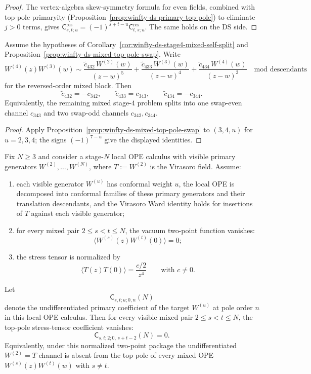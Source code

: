 \begin{proof}
The vertex-algebra skew-symmetry formula for even fields, combined with top-pole primaryity (Proposition~\ref{prop:winfty-ds-primary-top-pole}) to eliminate $j>0$ terms, gives $\mathsf{C}_{s,t;u}^{\mathrm{res}}=(-1)^{s+t-u}\mathsf{C}_{t,s;u}^{\mathrm{res}}$. The same holds on the DS side.
\end{proof}

\begin{corollary}
\label{cor:winfty-ds-stage4-mixed-swap-parity}
Assume the hypotheses of
Corollary~\ref{cor:winfty-ds-stage4-mixed-self-split} and
Proposition~\ref{prop:winfty-ds-mixed-top-pole-swap}. Write
\[
W^{(4)}(z)W^{(3)}(w)
\sim
\frac{\widetilde c_{432}\,W^{(2)}(w)}{(z-w)^5}
+\frac{\widetilde c_{433}\,W^{(3)}(w)}{(z-w)^4}
+\frac{\widetilde c_{434}\,W^{(4)}(w)}{(z-w)^3}
\quad\text{mod descendants}
\]
for the reversed-order mixed block. Then
\[
\widetilde c_{432}=-c_{342},
\qquad
\widetilde c_{433}=c_{343},
\qquad
\widetilde c_{434}=-c_{344}.
\]
Equivalently, the remaining mixed stage-$4$ problem splits into one
swap-even channel $c_{343}$ and two swap-odd channels
$c_{342},c_{344}$.
\end{corollary}

\begin{proof}
Apply Proposition~\ref{prop:winfty-ds-mixed-top-pole-swap} to $(3,4,u)$ for $u=2,3,4$; the signs $(-1)^{7-u}$ give the displayed identities.
\end{proof}

\begin{proposition}
\label{prop:winfty-formal-mixed-virasoro-zero}
Fix $N \ge 3$ and consider a stage-$N$ local OPE calculus with visible
primary generators $W^{(2)},\dots,W^{(N)}$, where
$T:=W^{(2)}$ is the Virasoro field. Assume:
\begin{enumerate}[label=\textup{(\roman*)}]
\item each visible generator $W^{(u)}$ has conformal weight $u$, the
 local OPE is decomposed into conformal families of these primary
 generators and their translation descendants, and the Virasoro Ward
 identity holds for insertions of $T$ against each visible generator;
\item for every mixed pair $2 \le s < t \le N$, the vacuum two-point
 function vanishes:
 \[
 \langle W^{(s)}(z)W^{(t)}(0)\rangle=0;
 \]
\item the stress tensor is normalized by
 \[
 \langle T(z)T(0)\rangle=\frac{c/2}{z^4}
 \qquad\text{with } c\neq 0.
 \]
\end{enumerate}
Let
\[
\mathsf{C}_{s,t;u;0,n}(N)
\]
denote the undifferentiated primary coefficient of the target
$W^{(u)}$ at pole order $n$ in this local OPE calculus. Then for every
visible mixed pair $2 \le s < t \le N$, the top-pole stress-tensor
coefficient vanishes:
\[
\mathsf{C}_{s,t;2;0,\,s+t-2}(N)=0.
\]
Equivalently, under this normalized two-point package the
undifferentiated $W^{(2)}=T$ channel is absent from the top pole of
every mixed OPE $W^{(s)}(z)W^{(t)}(w)$ with $s\ne t$.
\end{proposition}

